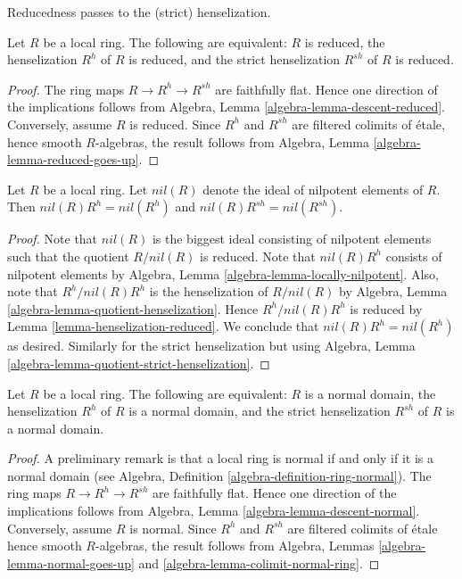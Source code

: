 \begin{lemma}
\label{lemma-henselization-reduced}
\begin{slogan}
Reducedness passes to the (strict) henselization.
\end{slogan}
Let $R$ be a local ring.
The following are equivalent: $R$ is reduced,
the henselization $R^h$ of $R$ is reduced, and
the strict henselization $R^{sh}$ of $R$ is reduced.
\end{lemma}

\begin{proof}
The ring maps $R \to R^h \to R^{sh}$ are faithfully flat.
Hence one direction of the implications follows from
Algebra, Lemma \ref{algebra-lemma-descent-reduced}.
Conversely, assume $R$ is reduced. Since $R^h$ and $R^{sh}$
are filtered colimits of \'etale, hence smooth $R$-algebras, the
result follows from
Algebra, Lemma \ref{algebra-lemma-reduced-goes-up}.
\end{proof}

\begin{lemma}
\label{lemma-henselization-nil}
Let $R$ be a local ring. Let $nil(R)$ denote the ideal of
nilpotent elements of $R$. Then $nil(R)R^h = nil(R^h)$ and
$nil(R)R^{sh} = nil(R^{sh})$.
\end{lemma}

\begin{proof}
Note that $nil(R)$ is the biggest ideal consisting of nilpotent elements
such that the quotient $R/nil(R)$ is reduced. Note that $nil(R)R^h$
consists of nilpotent elements by
Algebra, Lemma \ref{algebra-lemma-locally-nilpotent}.
Also, note that $R^h/nil(R) R^h$ is the
henselization of $R/nil(R)$ by
Algebra, Lemma \ref{algebra-lemma-quotient-henselization}.
Hence $R^h/nil(R)R^h$ is reduced by
Lemma \ref{lemma-henselization-reduced}.
We conclude that $nil(R) R^h = nil(R^h)$ as desired.
Similarly for the strict henselization but using
Algebra, Lemma \ref{algebra-lemma-quotient-strict-henselization}.
\end{proof}

\begin{lemma}
\label{lemma-henselization-normal}
Let $R$ be a local ring.
The following are equivalent: $R$ is a normal domain,
the henselization $R^h$ of $R$ is a normal domain, and
the strict henselization $R^{sh}$ of $R$ is a normal domain.
\end{lemma}

\begin{proof}
A preliminary remark is that a local ring is normal if and only if it is
a normal domain (see
Algebra, Definition \ref{algebra-definition-ring-normal}).
The ring maps $R \to R^h \to R^{sh}$ are faithfully flat.
Hence one direction of the implications follows from
Algebra, Lemma \ref{algebra-lemma-descent-normal}.
Conversely, assume $R$ is normal. Since $R^h$ and $R^{sh}$
are filtered colimits of \'etale hence smooth $R$-algebras, the
result follows from
Algebra, Lemmas \ref{algebra-lemma-normal-goes-up} and
\ref{algebra-lemma-colimit-normal-ring}.
\end{proof}


